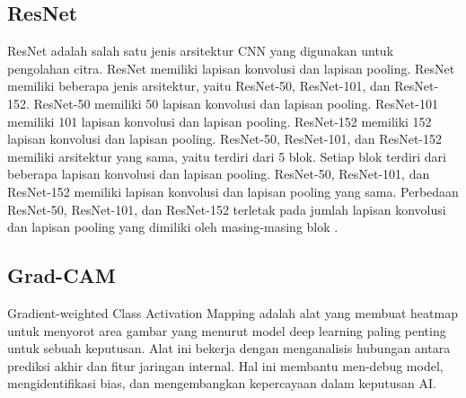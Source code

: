 \subsection{ResNet}
\label{sec:224}

ResNet adalah salah satu jenis arsitektur CNN yang digunakan untuk pengolahan citra. ResNet memiliki lapisan konvolusi dan lapisan pooling. ResNet memiliki beberapa jenis arsitektur, yaitu ResNet-50, ResNet-101, dan ResNet-152. ResNet-50 memiliki 50 lapisan konvolusi dan lapisan pooling. ResNet-101 memiliki 101 lapisan konvolusi dan lapisan pooling. ResNet-152 memiliki 152 lapisan konvolusi dan lapisan pooling. ResNet-50, ResNet-101, dan ResNet-152 memiliki arsitektur yang sama, yaitu terdiri dari 5 blok. Setiap blok terdiri dari beberapa lapisan konvolusi dan lapisan pooling. ResNet-50, ResNet-101, dan ResNet-152 memiliki lapisan konvolusi dan lapisan pooling yang sama. Perbedaan ResNet-50, ResNet-101, dan ResNet-152 terletak pada jumlah lapisan konvolusi dan lapisan pooling yang dimiliki oleh masing-masing blok \parencite{He2016}.

\subsection{Grad-CAM}
\label{sec:225}

Gradient-weighted Class Activation Mapping adalah alat yang membuat heatmap untuk menyorot area gambar yang menurut model deep learning paling penting untuk sebuah keputusan. Alat ini bekerja dengan menganalisis hubungan antara prediksi akhir dan fitur jaringan internal. Hal ini membantu men-debug model, mengidentifikasi bias, dan mengembangkan kepercayaan dalam keputusan AI.